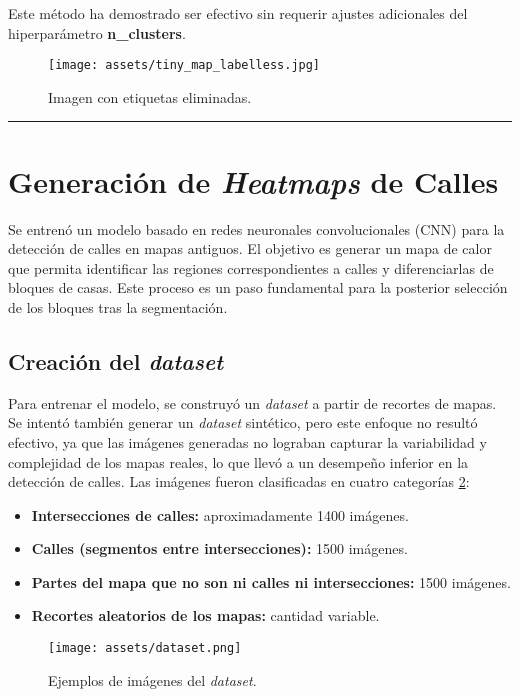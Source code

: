\documentclass[twocolumn, fontsize=10pt]{article}
\begin{document}
Este método ha demostrado ser efectivo sin requerir ajustes adicionales del hiperparámetro \textbf{n\_clusters}.

\begin{figure}[H]
    \centering
    \texttt{[image: assets/tiny\_map\_labelless.jpg]}
    \caption{Imagen con etiquetas eliminadas.}
    \label{fig:tiny_map_labelless}
\end{figure}

\rule{\linewidth}{0.5pt}
\section{Generación de \textit{Heatmaps} de Calles}

Se entrenó un modelo basado en redes neuronales convolucionales (CNN) para la detección de calles en mapas antiguos. El objetivo es generar un mapa de calor que permita identificar las regiones correspondientes a calles y diferenciarlas de bloques de casas. Este proceso es un paso fundamental para la posterior selección de los bloques tras la segmentación.

\subsection{Creación del \textit{dataset}}

Para entrenar el modelo, se construyó un \textit{dataset} a partir de recortes de mapas. Se intentó también generar un \textit{dataset} sintético, pero este enfoque no resultó efectivo, ya que las imágenes generadas no lograban capturar la variabilidad y complejidad de los mapas reales, lo que llevó a un desempeño inferior en la detección de calles. Las imágenes fueron clasificadas en cuatro categorías \ref{fig:dataset}:

\begin{itemize}
    \item \textbf{Intersecciones de calles:} aproximadamente 1400 imágenes.
    \item \textbf{Calles (segmentos entre intersecciones):} 1500 imágenes.
    \item \textbf{Partes del mapa que no son ni calles ni intersecciones:} 1500 imágenes.
    \item \textbf{Recortes aleatorios de los mapas:} cantidad variable.
\end{itemize}

\begin{figure}[H]
    \centering
    \texttt{[image: assets/dataset.png]}
    \caption{Ejemplos de imágenes del \textit{dataset}.}
    \label{fig:dataset}
\end{figure}
\end{document}
